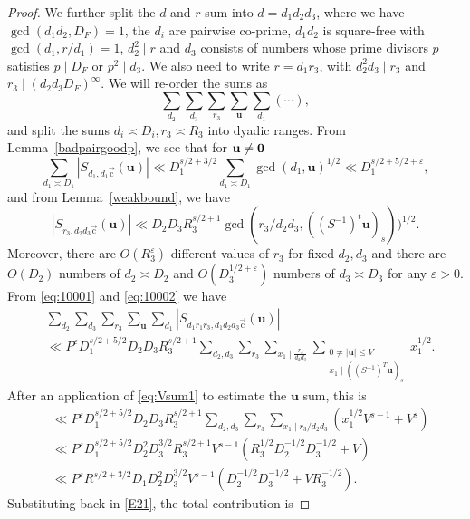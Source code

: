 \documentclass[letterpaper,11pt]{amsart}
\numberwithin{equation}{section}
\theoremstyle{definition}
\numberwithin{equation}{section}
\newcommand{\uu}{\mathbf{u}}
\newcommand{\uc}{{\vec{\mathrm{c}}}}
\def\vecnull{{\text{\boldmath$0$}}}
\newcommand{\ve}{\varepsilon}
\begin{document}
\begin{proof}
We further split the $d$ and $r$-sum into $d=d_1d_2d_3$, where we have $\gcd(d_1d_2,D_F)=1$, the $d_i$ are pairwise co-prime, $d_1d_2$ is square-free with $\gcd(d_1,r/d_1)=1$, $d_2^2\mid r$ and $d_3$ consists of numbers whose prime divisors $p$ satisfies $p\mid D_F$ or $p^2\mid d_3$. We also need to write $r=d_1r_3$, with $d_2^2d_3\mid r_3$ and $r_3\mid (d_2d_3D_F)^\infty$. 
We will re-order the sums as 
\begin{equation*}
\sum_{d_2}\sum_{d_3}\sum_{r_3}\sum_{\uu}\sum_{d_1}(\cdots),
\end{equation*}
and split the sums $d_i\asymp D_i, r_3\asymp R_3$ into dyadic ranges.
From Lemma~\ref{badpairgoodp}, we see that for $\uu\not=\vecnull$
\begin{equation}\label{eq:10001}
\sum_{d_1\asymp D_1}|S_{d_1,d_1\uc}(\uu)|\ll D_1^{s/2+3/2}\sum_{d_1\asymp D_1}\gcd(d_1,\uu)^{1/2}\ll D_1^{s/2+5/2+\ve},
\end{equation}
and from Lemma~\ref{weakbound}, we have 
\begin{equation}\label{eq:10002}
|S_{r_3,d_2d_3\uc}(\uu)|\ll D_2D_3 R_3^{s/2+1}\gcd(r_3/d_2d_3,((S^{-1})^t\uu)_s))^{1/2}.
\end{equation} 
Moreover, there are $O(R_3^\ve)$ different values of $r_3$ for fixed $d_2,d_3$ and there are $O(D_2)$ numbers of $d_2\asymp D_2$ and $O(D_3^{1/2+\varepsilon})$ numbers of $d_3\asymp D_3$ for any $\varepsilon>0$. From \eqref{eq:10001} and \eqref{eq:10002} we have 
\begin{align*}
&\sum_{d_2}\sum_{d_3}\sum_{r_3}\sum_{\uu}\sum_{d_1}|S_{d_1r_1r_3,d_1d_2d_3\uc}(\uu)|\\&\ll P^{\ve}  D_1^{s/2+5/2}D_2D_3R_3^{s/2+1}\sum_{d_2,d_3}\sum_{r_3}\sum_{x_1\mid \frac{r_3}{d_2d_3}}\sum_{\substack{0\neq |\uu|\leq V\\ x_1\mid ((S^{-1})^T \uu)_s}}x_1^{1/2}.
\end{align*}
After an application of \eqref{eq:Vsum1} to estimate the $\uu$ sum, this  is 
\begin{align*}
&\ll P^{\ve} D_1^{s/2+5/2}D_2D_3R_3^{s/2+1}\sum_{d_2,d_3}\sum_{r_3}\sum_{x_1\mid r_3/d_2d_3}(x_1^{1/2}V^{s-1}+V^s)\\
& \ll P^{\ve}D_1^{s/2+5/2}D_2^{2}D_3^{3/2}R_3^{s/2+1}V^{s-1}(R_3^{1/2}D_2^{-1/2}D_3^{-1/2}+V)\\
&\ll P^{\ve}  R^{s/2+3/2} D_1D_2^{2}D_3^{3/2}V^{s-1}(D_2^{-1/2}D_3^{-1/2}+VR_3^{-1/2}).
\end{align*}
Substituting back in \eqref{E21}, the total contribution is

\end{proof}
\end{document}
